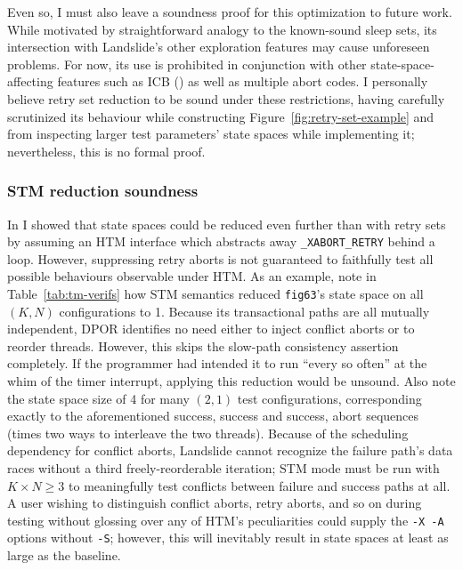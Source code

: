 Even so, I must also leave a soundness proof for this optimization to future work.
While
motivated by straightforward analogy to the known-sound sleep sets,
its intersection with Landslide's other exploration features may cause unforeseen problems.
For now, its use is prohibited in conjunction with other state-space-affecting features
such as ICB (\sect{\ref{sec:landslide-icb}})
as well as multiple abort codes.
I personally believe retry set reduction to be sound under these restrictions,
having carefully scrutinized its behaviour
while constructing Figure~\ref{fig:retry-set-example}
and from inspecting larger test parameters' state spaces while implementing it;
nevertheless, this is no formal proof.

\subsubsection{STM reduction soundness}

In \sect{\ref{sec:tm-eval-stm}} I showed that state spaces could be reduced even further than with retry sets
by assuming an HTM interface which abstracts away {\tt \_XABORT\_RETRY} behind a loop.
However, suppressing retry aborts is not guaranteed to faithfully test all possible behaviours
observable under HTM.
As an example, note in Table~\ref{tab:tm-verifs}
how STM semantics reduced %
{\tt fig63}'s state space on all $(K,N)$ configurations to 1.
Because its transactional paths are all mutually independent,
DPOR identifies no need either to inject conflict aborts or to reorder threads.
However, this skips the slow-path consistency assertion completely.
If the programmer had intended it to run ``every so often'' at the whim of the timer interrupt,
applying this reduction would be unsound.
Also note the state space size of 4 for many $(2,1)$ test configurations,
corresponding exactly to the aforementioned success, success and success, abort sequences
(times two ways to interleave the two threads).
Because of the scheduling dependency for conflict aborts,
Landslide cannot recognize the failure path's data races
without a third freely-reorderable iteration;
STM mode must be run with $K \times N \ge 3$ to meaningfully test conflicts between failure and success paths at all.
A user wishing to distinguish conflict aborts, retry aborts, and so on during testing
without glossing over any of HTM's peculiarities
could supply the {\tt -X -A} options without {\tt -S};
however, this will inevitably result in state spaces at least as large as the baseline.


